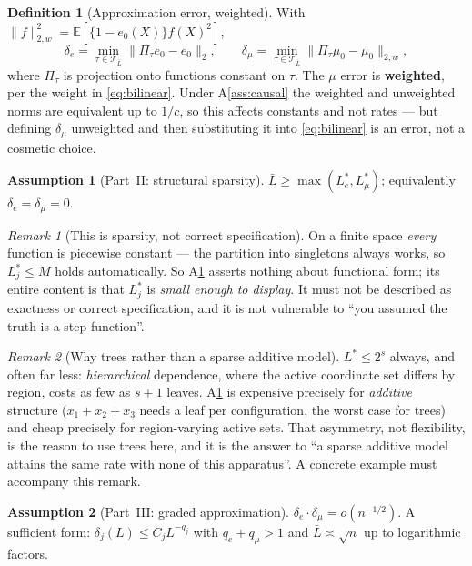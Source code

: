 \documentclass[11pt]{article}
\theoremstyle{plain}
\theoremstyle{definition}
\newtheorem{assumption}{Assumption}
\newtheorem{definition}{Definition}
\theoremstyle{remark}
\newtheorem{remark}{Remark}
\newcommand{\E}{\mathbb{E}}
\newcommand{\cT}{\mathcal{T}}
\newcommand{\ez}{e_0}
\newcommand{\mz}{\mu_0}
\newcommand{\Ltwo}[1]{\lVert #1 \rVert_{2}}
\newcommand{\Lw}[1]{\lVert #1 \rVert_{2,w}}
\begin{document}
\begin{definition}[Approximation error, weighted]\label{def:delta}
With $\Lw{f}^2=\E[\{1-\ez(X)\}f(X)^2]$,
\[
  \delta_e=\min_{\tau\in\cT_{\bar L}}\Ltwo{\Pi_\tau \ez-\ez},
  \qquad
  \delta_\mu=\min_{\tau\in\cT_{\bar L}}\Lw{\Pi_\tau\mz-\mz},
\]
where $\Pi_\tau$ is projection onto functions constant on $\tau$. The
$\mu$ error is \textbf{weighted}, per the weight in \eqref{eq:bilinear}. Under
A\ref{ass:causal} the weighted and unweighted norms are equivalent up to $1/c$,
so this affects constants and not rates --- but defining $\delta_\mu$ unweighted
and then substituting it into \eqref{eq:bilinear} is an error, not a cosmetic
choice.
\end{definition}

\begin{assumption}[Part~II: structural sparsity]\label{ass:sparsity}
$\bar L\ge\max(L^*_e,L^*_\mu)$; equivalently $\delta_e=\delta_\mu=0$.
\end{assumption}

\begin{remark}[This is sparsity, not correct specification]\label{rem:not-exact}
On a finite space \emph{every} function is piecewise constant --- the partition
into singletons always works, so $L^*_j\le M$ holds automatically. So
A\ref{ass:sparsity} asserts nothing about functional form; its entire content is
that $L^*_j$ is \emph{small enough to display}. It must not be described as
exactness or correct specification, and it is not vulnerable to ``you assumed the
truth is a step function''.
\end{remark}

\begin{remark}[Why trees rather than a sparse additive model]\label{rem:additive}
$L^*\le2^s$ always, and often far less: \emph{hierarchical} dependence, where the
active coordinate set differs by region, costs as few as $s+1$ leaves.
A\ref{ass:sparsity} is expensive precisely for \emph{additive} structure
($x_1+x_2+x_3$ needs a leaf per configuration, the worst case for trees) and
cheap precisely for region-varying active sets. That asymmetry, not flexibility,
is the reason to use trees here, and it is the answer to ``a sparse additive
model attains the same rate with none of this apparatus''. A concrete example
must accompany this remark.
\end{remark}

\begin{assumption}[Part~III: graded approximation]\label{ass:graded}
$\delta_e\cdot\delta_\mu=o(n^{-1/2})$. A sufficient form:
$\delta_j(L)\le C_jL^{-q_j}$ with $q_e+q_\mu>1$ and $\bar L\asymp\sqrt n$ up to
logarithmic factors.
\end{assumption}
\end{document}
